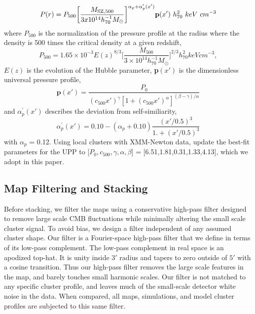 \documentclass[a4paper,fleqn,usenatbib]{mnras}
\begin{document}
\begin{equation}
P(r) = P_{500} \bigg[ \frac{M_{\rm SZ,500}}{3x10^{14} h^{-1}_{70} M_{\odot}} \bigg]^{\alpha_{p} + \alpha^{\prime}_{p}(x')} \textbf{p}(x') \ h^{2}_{70} \ keV \ cm^{-3}
\end{equation}
where $P_{500}$ is the normalization of the pressure profile at the radius where the density is 500 times the critical density at a given redshift,
\begin{equation}
P_{500} = 1.65 \times 10^{-3} E(z)^{8/3} \bigg[\frac{M_{500}}{3 \times 10^{14} h_{70}^{-1} M_{\odot}}\bigg]^{2/3} h_{70}^2 keV cm^{-3},
\end{equation}
$E(z)$ is the evolution of the Hubble parameter, \textbf{p}$(x')$ is the dimensionless universal pressure profile,
\begin{equation}
\textbf{p}(x') = \frac{P_{0}}{(c_{500} x')^{\gamma} [1 + (c_{500} x')^{\alpha}]^{(\beta-\gamma)/\alpha}}
\end{equation}
and $\alpha^{\prime}_{p}(x')$ describes the deviation from self-similiarity,
\begin{equation}
\alpha^{\prime}_{p}(x') = 0.10 - (\alpha_{p} + 0.10) \frac{(x'/0.5)^{3}}{1. + (x'/0.5)^{3}}
\end{equation}
with $\alpha_p$ = 0.12.
Using local clusters with XMM-Newton data, \cite{2013A&A...550A.131P} update the best-fit parameters for the UPP to [$P_{0},c_{500},\gamma,\alpha,\beta$] = [6.51,1.81,0.31,1.33,4.13], which we adopt in this paper.


\subsection{Map Filtering and Stacking}
Before stacking, we filter the maps using a conservative high-pass filter designed to remove large scale CMB fluctuations while minimally altering the small scale cluster signal. 
To avoid bias, we design a filter independent of any assumed cluster shape.
Our filter is a Fourier-space high-pass filter that we define in terms of its low-pass complement.  
The low-pass complement in real space is an apodized top-hat. 
It is unity inside $3'$ radius and tapers to zero outside of $5'$ with a cosine transition. 
Thus our high-pass filter removes the large scale features in the map, and barely touches small harmonic scales. 
Our filter is not matched to any specific cluster profile, and leaves much of the small-scale detector white noise in the data.  
When compared, all maps, simulations, and model cluster profiles are subjected to this same filter. 
\end{document}
